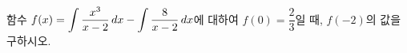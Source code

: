 함수 $f(x)=\displaystyle\int \dfrac{x^3}{x-2}\mkern3mu dx-\displaystyle\int \dfrac{8}{x-2}\mkern3mu dx$에 대하여 $f(0)=\dfrac{2}{3}$일 때, $f(-2)$의 값을 구하시오.
